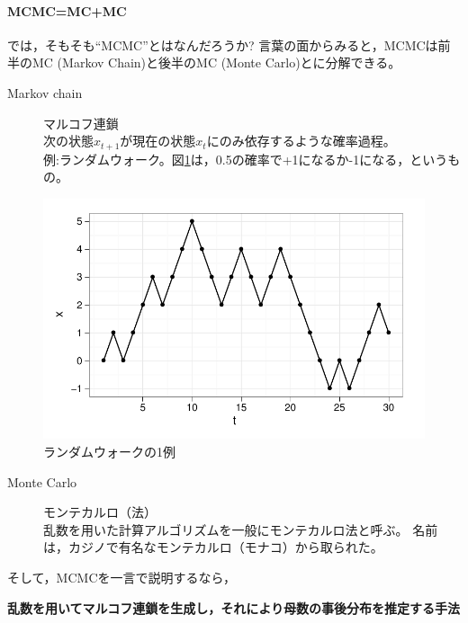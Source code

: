\documentclass[11pt,uplatex]{jsarticle}
\begin{document}

\paragraph{MCMC=MC+MC}

では，そもそも``MCMC''とはなんだろうか?
言葉の面からみると，MCMCは前半のMC (Markov Chain)と後半のMC (Monte Carlo)とに分解できる。

\begin{description}
\item[Markov chain] マルコフ連鎖\\
次の状態$x_{t+1}$が現在の状態$x_{t}$にのみ依存するような確率過程。\\
例:ランダムウォーク。図\ref{random_walk_plot}は，0.5の確率で+1になるか-1になる，というもの。
\end{description}

\begin{figure}[hbtp]
  \begin{center}
    \includegraphics[bb=0 0 380 240, clip, width=300 bp]{random_walk2.pdf}
  \end{center}
  \caption{ランダムウォークの1例}
  \label{random_walk_plot}
\end{figure}

\begin{description}
\item[Monte Carlo] モンテカルロ（法）\\
乱数を用いた計算アルゴリズムを一般にモンテカルロ法と呼ぶ。
名前は，カジノで有名なモンテカルロ（モナコ）から取られた。
\end{description}

そして，MCMCを一言で説明するなら，

\vspace{2zw}
\hspace{10mm}
\begin{minipage}{110mm}
\begin{breakbox}
\noindent
{\large\bf 乱数を用いてマルコフ連鎖を生成し，それにより母数の事後分布を推定する手法}
\end{breakbox}
\end{minipage}
\vspace{2zw}
\end{document}
